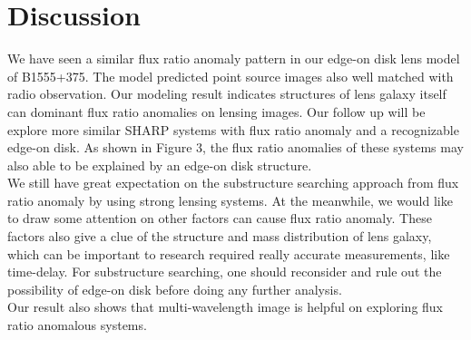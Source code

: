 \documentclass[manuscript]{emulateapj}
\begin{document}
\section{Discussion}
We have seen a similar flux ratio anomaly pattern in our edge-on disk lens model of B1555+375. The model predicted point source images also well matched with radio observation. Our modeling result indicates structures of lens galaxy itself can dominant flux ratio anomalies on lensing images. 
Our follow up will be explore more similar SHARP systems with flux ratio anomaly and a recognizable edge-on disk. As shown in Figure 3, the flux ratio anomalies of these systems may also able to be explained by an edge-on disk structure.\\
We still have great expectation on the substructure searching approach from flux ratio anomaly by using strong lensing systems. At the meanwhile, we would like to draw some attention on other factors can cause flux ratio anomaly. These factors also give a clue of the structure and mass distribution of lens galaxy, which can be important to research required really accurate measurements, like time-delay.  For substructure searching, one should reconsider and rule out the possibility of edge-on disk before doing any further analysis.\\
Our result also shows that multi-wavelength image is helpful on exploring flux ratio anomalous systems.





\end{document}
